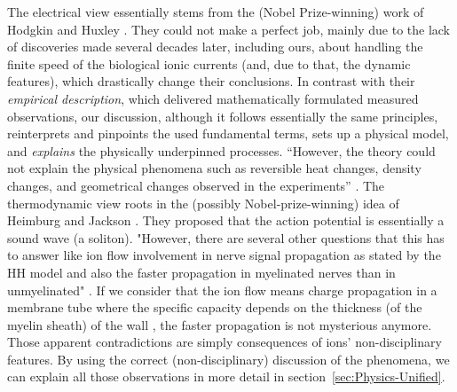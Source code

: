 The electrical view essentially stems from the (Nobel Prize-winning) work of Hodgkin and Huxley \cite{HodgkinHuxley:1952}. They could not make a perfect job, mainly due to the lack of
discoveries made several decades later, including ours, about handling
the finite speed of the biological ionic currents (and, due to that, the dynamic features), which drastically change
their conclusions. In contrast with their \textit{empirical description}, which delivered mathematically formulated measured observations, our discussion, although it follows essentially
the same principles, reinterprets and pinpoints the used fundamental terms, sets up a physical model, and \textit{explains} the physically underpinned processes. ``However, the theory could not explain the physical
phenomena such as reversible heat changes, density changes,
and geometrical changes observed in the experiments'' \cite{ComparisonHHandSoliton:2010}.
The thermodynamic view roots in the (possibly Nobel-prize-winning)
idea of Heimburg and Jackson \cite{SolitonPropagation:2005}. They proposed that the action potential is essentially a sound wave (a soliton). "However, there are several other questions that this has to answer like ion flow involvement in nerve signal propagation as stated by the \gls{HH} model and also the faster propagation in myelinated nerves than in unmyelinated" \cite{ComparisonHHandSoliton:2010}.
If we consider that the ion flow means charge propagation in a membrane tube where the specific capacity depends on the thickness (of the myelin sheath) of the wall \cite{VeghUnifiedCrossdisciplinaryModel:2026}, the faster propagation is not mysterious anymore.
Those apparent contradictions are simply consequences of ions' non-disciplinary features.
By using the correct (non-disciplinary) discussion of the phenomena,
we can explain all those observations in more detail in section~\ref{sec:Physics-Unified}.

